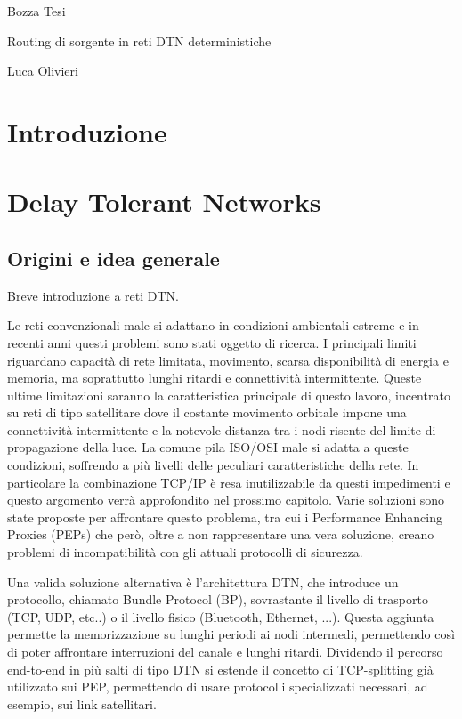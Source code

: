 \documentclass[a4paper]{article}
\begin{document}
	\centerline{\sc Bozza Tesi}
	\centerline{\sc \large Routing di sorgente in reti DTN deterministiche}
	\centerline{\sc Luca Olivieri}
	\vspace{2pc}
	
	\tableofcontents
	
	\clearpage
	\section{Introduzione}
	
	\section{Delay Tolerant Networks}
		
		\subsection{Origini e idea generale}
		{\sc Breve introduzione a reti DTN.}
		
		Le reti convenzionali male si adattano in condizioni ambientali estreme e in recenti anni questi problemi sono stati oggetto di ricerca. I principali limiti riguardano capacità di rete limitata, movimento, scarsa disponibilità di energia e memoria, ma soprattutto lunghi ritardi e connettività intermittente. Queste ultime limitazioni saranno la caratteristica principale di questo lavoro, incentrato su reti di tipo satellitare dove il costante movimento orbitale impone una connettività intermittente e la notevole distanza tra i nodi risente del limite di propagazione della luce. La comune pila ISO/OSI male si adatta a queste condizioni, soffrendo a più livelli delle peculiari caratteristiche della rete. In particolare la combinazione TCP/IP è resa inutilizzabile da questi impedimenti e questo argomento verrà approfondito nel prossimo capitolo. Varie soluzioni sono state proposte per affrontare questo problema, tra cui i Performance Enhancing Proxies (PEPs) che però, oltre a non rappresentare una vera soluzione, creano problemi di incompatibilità con gli attuali protocolli di sicurezza.
		
		Una valida soluzione alternativa è l'architettura DTN, che introduce un protocollo, chiamato Bundle Protocol (BP), sovrastante il livello di trasporto (TCP, UDP, etc..) o il livello fisico (Bluetooth, Ethernet, ...). Questa aggiunta permette la memorizzazione su lunghi periodi ai nodi intermedi, permettendo così di poter affrontare interruzioni del canale e lunghi ritardi. Dividendo il percorso end-to-end in più salti di tipo DTN si estende il concetto di TCP-splitting già utilizzato sui PEP, permettendo di usare protocolli specializzati necessari, ad esempio, sui link satellitari.
		
\end{document}
